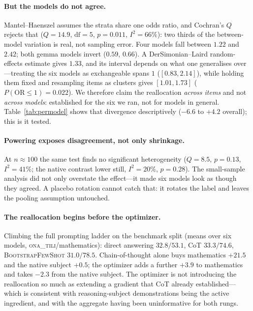 \documentclass[11pt]{article}
\newcommand{\ona}{\textsc{ona\_tili}}
\newcommand{\bsfs}{\textsc{BootstrapFewShot}}
\begin{document}
\paragraph{But the models do not agree.} Mantel--Haenszel assumes the strata share one
odds ratio, and Cochran's $Q$ rejects that ($Q{=}14.9$, $\mathrm{df}{=}5$, $p{=}0.011$,
$I^2{=}66\%$): two thirds of the between-model variation is real, not sampling error.
Four models fall between $1.22$ and $2.42$; both gemma models invert ($0.59$, $0.66$). A
DerSimonian--Laird random-effects estimate gives $1.33$, and its interval depends on what
one generalises over---treating the six models as exchangeable spans $1$
($[0.83, 2.14]$), while holding them fixed and resampling items as clusters gives
$[1.01, 1.73]$ ($P(\mathrm{OR}{\le}1){=}0.022$). We therefore claim the reallocation
\emph{across items} and not \emph{across models}: established for the six we ran, not for
models in general. Table~\ref{tab:permodel} shows that divergence descriptively
($-6.6$ to $+4.2$ overall); this is it tested.

\paragraph{Powering exposes disagreement, not only shrinkage.} At $n{\approx}100$ the
same test finds no significant heterogeneity ($Q{=}8.5$, $p{=}0.13$, $I^2{=}41\%$; the
native contrast lower still, $I^2{=}20\%$, $p{=}0.28$). The small-sample analysis did not
only overstate the effect---it made six models look as though they agreed. A placebo
rotation cannot catch that: it rotates the label and leaves the pooling assumption
untouched.

\paragraph{The reallocation begins before the optimizer.} Climbing the full prompting
ladder on the benchmark split (means over six models, \ona{}/mathematics): direct
answering $32.8/53.1$, CoT $33.3/74.6$, \bsfs{} $31.0/78.5$. Chain-of-thought alone buys
mathematics $+21.5$ and the native subject $+0.5$; the optimizer adds a further $+3.9$ to
mathematics and takes $-2.3$ from the native subject. The optimizer is not introducing
the reallocation so much as extending a gradient that CoT already established---which is
consistent with reasoning-subject demonstrations being the active ingredient, and with
the aggregate having been uninformative for both rungs.
\end{document}
